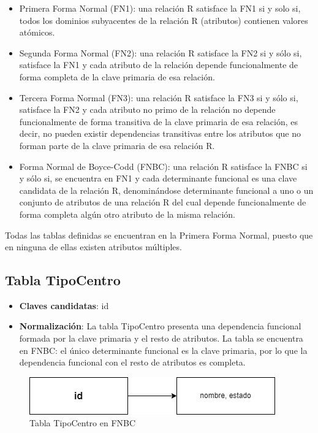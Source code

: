 \begin{itemize}
    \item Primera Forma Normal (FN1): una relación R satisface la FN1 si y solo si, todos los dominios subyacentes de la relación R (atributos) contienen valores atómicos.
    \item Segunda Forma Normal (FN2): una relación R satisface la FN2 si y sólo si, satisface la FN1 y cada atributo de la relación depende funcionalmente de forma completa de la clave primaria de esa relación.
    \item Tercera Forma Normal (FN3): una relación R satisface la FN3 si y sólo si, satisface la FN2 y cada atributo no primo de la relación no depende funcionalmente de forma transitiva de la clave primaria de esa relación, es decir, no pueden existir dependencias transitivas entre los atributos que no forman parte de la clave primaria de esa relación R.
    \item Forma Normal de Boyce-Codd (FNBC): una relación R satisface la FNBC si y sólo si, se encuentra en FN1 y cada determinante funcional es una clave candidata de la relación R, denominándose determinante funcional a uno o un conjunto de atributos de una relación R del cual depende funcionalmente de forma completa algún otro atributo de la misma relación.
\end{itemize}

Todas las tablas definidas se encuentran en la Primera Forma Normal, puesto que en ninguna de ellas existen atributos múltiples.

\subsection{Tabla TipoCentro}
    \begin{itemize}
        \item \textbf{Claves candidatas}: id
        \item \textbf{Normalización}: La tabla TipoCentro presenta una dependencia funcional formada por la clave primaria y el resto de atributos. La tabla se encuentra en FNBC: el único determinante funcional es la clave primaria, por lo que la dependencia funcional con el resto de atributos es completa.
    \end{itemize}

\begin{figure}[H]
\centering
\includegraphics[scale=0.75]{img/diagramas/Datos/FNBC-TipoCentro.png}
\caption{Tabla TipoCentro en FNBC}\label{fig:Tabla TipoCentro en FNBC}   
\end{figure}


